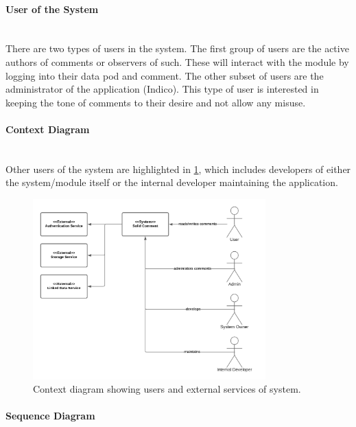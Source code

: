 \paragraph{User of the System}\mbox{}\\

There are two types of users in the system. The first group of users are the active authors of comments or observers of such. These will interact with the module by logging into their data pod and comment. The other subset of users are the administrator of the application (Indico). This type of user is interested in keeping the tone of comments to their desire and not allow any misuse.

\paragraph{Context Diagram}\mbox{}\\

Other users of the system are highlighted in \ref{fig:poc-comment-context_diagram}, which includes developers of either the system/module itself or the internal developer maintaining the application.

\begin{figure}[H]
    \centering
    \includegraphics[width=0.8\textwidth]{prototype/graphs/poc-comment-context_diagram.png}
    \caption{Context diagram showing users and external services of system.}
    \label{fig:poc-comment-context_diagram}
\end{figure}

\paragraph{Sequence Diagram}\mbox{}\\


